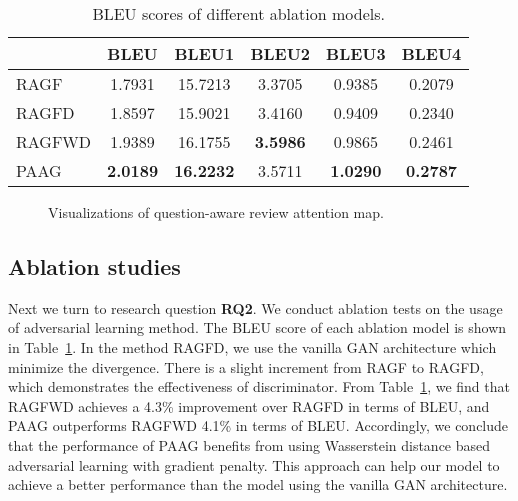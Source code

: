 \begin{table}[t]
\centering
\caption{BLEU scores of different ablation models.}
\footnotesize
\begin{tabular}{@{}lcc cc c@{}}
\toprule
& BLEU & BLEU1  & BLEU2 & BLEU3 & BLEU4 \\
\midrule

RAGF & 1.7931 & 15.7213 & 3.3705 & 0.9385 & 0.2079 \\
RAGFD & 1.8597 & 15.9021 & 3.4160 & 0.9409 & 0.2340 \\
RAGFWD & 1.9389 & 16.1755 & \textbf{3.5986} & 0.9865 & 0.2461 \\
PAAG & \textbf{2.0189} & \textbf{16.2232}  & 3.5711 & \textbf{1.0290} & \textbf{0.2787} \\
\bottomrule
\end{tabular}
 \vspace{-3mm}
\label{tab:comp_bleu_ablation}
\end{table}

\begin{figure}[!t]
  \centering
    \vspace{-8mm}
    \caption{Visualizations of question-aware review attention map.}
    \vspace{-2mm}
  \label{fig:attention}
\end{figure}

\subsection{Ablation studies}

Next we turn to research question \textbf{RQ2}.
We conduct ablation tests on the usage of adversarial learning method.
The BLEU score of each ablation model is shown in Table~\ref{tab:comp_bleu_ablation}.
In the method RAGFD, we use the vanilla GAN architecture which minimize the divergence.
There is a slight increment from RAGF to RAGFD, which demonstrates the effectiveness of discriminator.
From Table~\ref{tab:comp_bleu_ablation}, we find that RAGFWD achieves a 4.3\% improvement over RAGFD in terms of BLEU, and PAAG outperforms RAGFWD 4.1\% in terms of BLEU.
Accordingly, we conclude that the performance of PAAG benefits from using Wasserstein distance based adversarial learning with gradient penalty.
This approach can help our model to achieve a better performance than the model using the vanilla GAN architecture.


